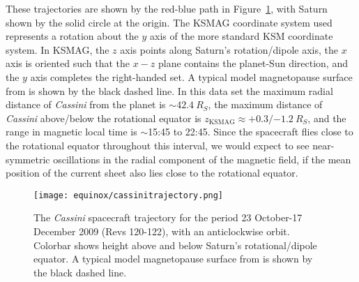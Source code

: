 These trajectories are shown by the red-blue path in Figure~\ref{equinox:fig:cassinitrajectory}, with Saturn shown by the solid circle at the origin. The KSMAG coordinate system used represents a rotation about the $y$ axis of the more standard KSM coordinate system. In KSMAG, the $z$ axis points along Saturn's rotation/dipole axis, the $x$ axis is oriented such that the $x-z$ plane contains the planet-Sun direction, and the $y$ axis completes the right-handed set. A typical model magnetopause surface from \citep{pilkington2015} is shown by the black dashed line. In this data set the maximum radial distance of \textit{Cassini} from the planet is ${\sim}\SI{42.4}{R_S}$, the maximum distance of \textit{Cassini} above/below the rotational equator is $z_\mathrm{KSMAG}\approx +0.3/\SI{-1.2}{R_S}$, and the range in magnetic local time is ${\sim}$15:45 to 22:45. Since the spacecraft flies close to the rotational equator throughout this interval, we would expect to see near-symmetric oscillations in the radial component of the magnetic field, if the mean position of the current sheet also lies close to the rotational equator.
\begin{figure}
\centering
\texttt{[image: equinox/cassinitrajectory.png]}
\caption[\textit{Cassini} spacecraft trajectory for 23 October – 17 December 2009.]{The \textit{Cassini} spacecraft trajectory for the period 23 October{\--}17 December 2009 (Revs 120{\--}122), with an anticlockwise orbit. Colorbar shows height above and below Saturn's rotational/dipole equator. A typical model magnetopause surface from \citet{pilkington2015} is shown by the black dashed line.}
\label{equinox:fig:cassinitrajectory}
\end{figure}

